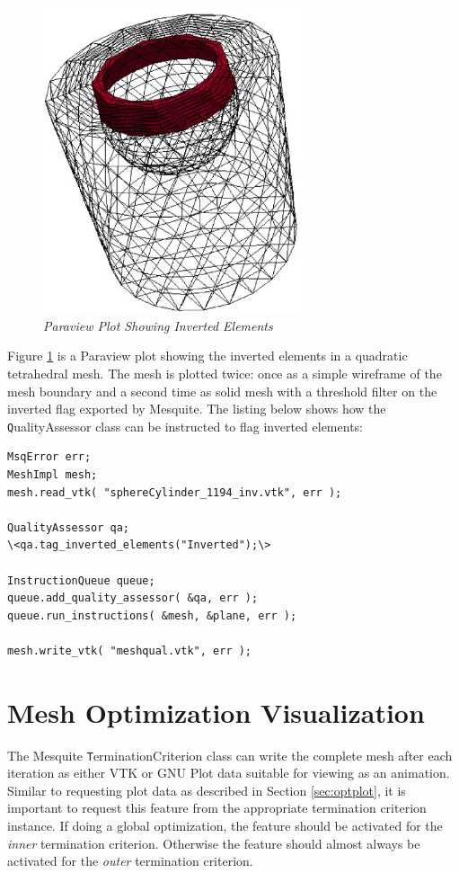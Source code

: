\begin{figure}[htb!]
\begin{center}
\includegraphics[width=3in]{meshqual3d}
\caption{\em Paraview Plot Showing Inverted Elements \label{fig:meshqual3d}}
\end{center}
\end{figure}

Figure \ref{fig:meshqual3d} is a Paraview plot showing the inverted elements in a quadratic tetrahedral mesh.  The mesh is plotted twice: once as a simple wireframe of the mesh boundary and a second time as solid mesh with a threshold filter on the inverted flag exported by Mesquite.  The listing below shows how the {\texttt QualityAssessor} class can be instructed to flag inverted elements:

\newpage
\begin{lstlisting}[frame=single]
MsqError err;
MeshImpl mesh;
mesh.read_vtk( "sphereCylinder_1194_inv.vtk", err );

QualityAssessor qa;
\<qa.tag_inverted_elements("Inverted");\>

InstructionQueue queue;
queue.add_quality_assessor( &qa, err );
queue.run_instructions( &mesh, &plane, err );

mesh.write_vtk( "meshqual.vtk", err );
\end{lstlisting}


\section{Mesh Optimization Visualization}

The Mesquite {\texttt TerminationCriterion} class can write the complete mesh after each iteration as either VTK or GNU Plot data suitable for viewing as an animation.	 Similar to requesting plot data as described in Section \ref {sec:optplot}, it is important to request this feature from the appropriate termination criterion instance.  If doing a global optimization, the feature should be activated for the {\em inner} termination criterion.  Otherwise the feature should almost always be activated for the {\em outer} termination criterion.

